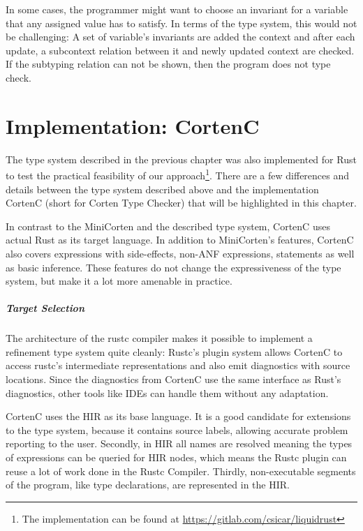 \documentclass[twoside, english, final]{sdqthesis}
\theoremstyle{definition}
\begin{document}
In some cases, the programmer might want to choose an invariant for a variable that any assigned value has to satisfy. In terms of the type system, this would not be challenging: A set of variable's invariants are added the context and after each update, a subcontext relation between it and newly updated context are checked. If the subtyping relation can not be shown, then the program does not type check.

\chapter{Implementation: CortenC} \label{ch:implementation}

The type system described in the previous chapter was also implemented for Rust to test the practical feasibility of our approach\footnote{The implementation can be found at \url{https://gitlab.com/csicar/liquidrust}}.
There are a few differences and details between the type system described above and the implementation CortenC (short for Corten Type Checker) that will be highlighted in this chapter.

In contrast to the MiniCorten and the described type system, CortenC uses actual Rust as its target language. In addition to MiniCorten's features, CortenC also covers expressions with side-effects, non-ANF expressions, statements as well as basic inference.
These features do not change the expressiveness of the type system, but make it a lot more amenable in practice.

\paragraph{Target Selection}
The architecture of the rustc compiler makes it possible to implement a refinement type system quite cleanly: Rustc's plugin system allows CortenC to access rustc's intermediate representations and also emit diagnostics with source locations. Since the diagnostics from CortenC use the same interface as Rust's diagnostics, other tools like IDEs can handle them without any adaptation.

CortenC uses the HIR as its base language. It is a good candidate for extensions to the type system, because it contains source labels, allowing accurate problem reporting to the user. Secondly, in HIR all names are resolved meaning the types of expressions can be queried for HIR nodes, which means the Rustc plugin can reuse a lot of work done in the Rustc Compiler. Thirdly, non-executable segments of the program, like type declarations, are represented in the HIR.
\end{document}

